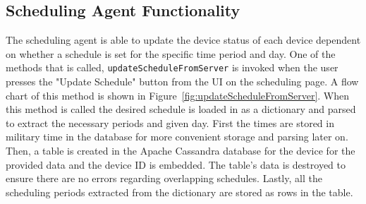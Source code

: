 \subsection{Scheduling Agent Functionality}
The scheduling agent is able to update the device status of each device dependent on whether a schedule is set for the specific time period and day. One of the methods that is called, \texttt{updateScheduleFromServer} is invoked when the user presses the "Update Schedule" button from the UI on the scheduling page. A flow chart of this method is shown in Figure~\ref{fig:updateScheduleFromServer}. When this method is called the desired schedule is loaded in as a dictionary and parsed to extract the necessary periods and given day. First the times are stored in military time in the database for more convenient storage and parsing later on. Then, a table is created in the Apache Cassandra database for the device for the provided data and the device ID is embedded. The table's data is destroyed to ensure there are no errors regarding overlapping schedules. Lastly, all the scheduling periods extracted from the dictionary are stored as rows in the table. 
